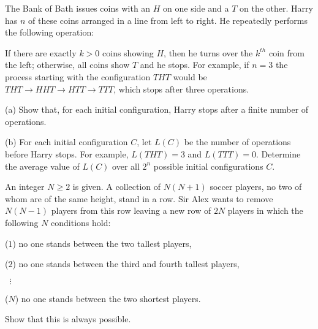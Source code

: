 



\renewcommand{\theenumi}{\alph{enumi}}



\noindent
 
\filbreak

\begin{problem}
[IMO2019PL5]
The Bank of Bath issues coins with an $H$ on one side and a $T$ on the other. Harry has $n$ of these coins arranged in a line from left to right. He repeatedly performs the following operation:

If there are exactly $k > 0$ coins showing $H$, then he turns over the $k^{th}$ coin from the left; otherwise, all coins show $T$ and he stops. For example, if $n = 3$ the process starting with the configuration $THT$ would be $THT \rightarrow HHT \rightarrow HTT \rightarrow TTT$, which stops after three operations.

(a) Show that, for each initial configuration, Harry stops after a finite number of operations.

(b) For each initial configuration $C$, let $L(C)$ be the number of operations before Harry stops. For example, $L(THT) = 3$ and $L(TTT) = 0$. Determine the average value of $L(C)$ over all $2^n$ possible initial configurations $C$.
\end{problem}

\begin{problem}
[IMO2017PL5]
An integer $N \ge 2$ is given. A collection of $N(N + 1)$ soccer players, no two of whom are of the same height, stand in a row. Sir Alex wants to remove $N(N - 1)$ players from this row leaving a new row of $2N$ players in which the following $N$ conditions hold:

($1$) no one stands between the two tallest players,

($2$) no one stands between the third and fourth tallest players,

$\;\;\vdots$

($N$) no one stands between the two shortest players.

Show that this is always possible.

\end{problem}


